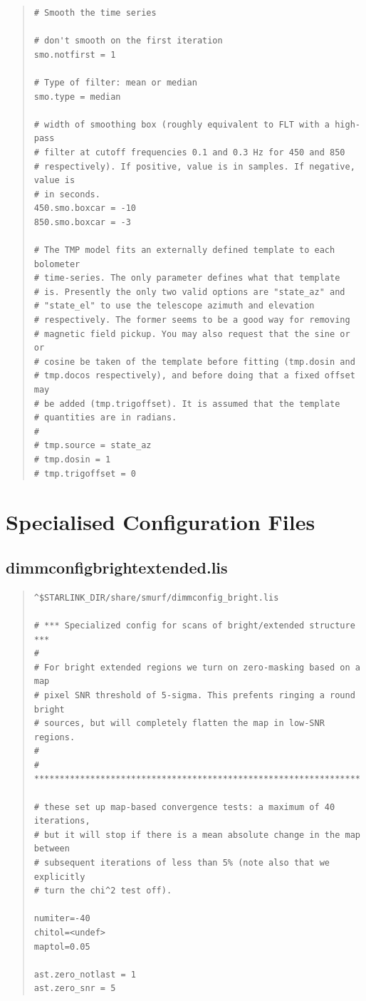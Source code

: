 \documentclass[twoside,11pt]{article}
\newcounter{box}
\newcommand{\xlabel}[1]{}
\renewcommand{\_}{\texttt{\symbol{95}}}
\newenvironment{myquote}{\begin{quote}\begin{small}}{\end{small}\end{quote}}
\begin{document}
\begin{myquote}
\begin{verbatim}
# Smooth the time series

# don't smooth on the first iteration
smo.notfirst = 1

# Type of filter: mean or median
smo.type = median

# width of smoothing box (roughly equivalent to FLT with a high-pass
# filter at cutoff frequencies 0.1 and 0.3 Hz for 450 and 850
# respectively). If positive, value is in samples. If negative, value is
# in seconds.
450.smo.boxcar = -10
850.smo.boxcar = -3

# The TMP model fits an externally defined template to each bolometer
# time-series. The only parameter defines what that template
# is. Presently the only two valid options are "state_az" and
# "state_el" to use the telescope azimuth and elevation
# respectively. The former seems to be a good way for removing
# magnetic field pickup. You may also request that the sine or or
# cosine be taken of the template before fitting (tmp.dosin and
# tmp.docos respectively), and before doing that a fixed offset may
# be added (tmp.trigoffset). It is assumed that the template
# quantities are in radians.
#
# tmp.source = state_az
# tmp.dosin = 1
# tmp.trigoffset = 0

\end{verbatim}
\end{myquote}


\section{\xlabel{special}Specialised Configuration Files}
\label{app:special}

\subsection{dimmconfig\_bright\_extended.lis}
\begin{myquote}
\begin{verbatim}
^$STARLINK_DIR/share/smurf/dimmconfig_bright.lis

# *** Specialized config for scans of bright/extended structure ***
#
# For bright extended regions we turn on zero-masking based on a map
# pixel SNR threshold of 5-sigma. This prefents ringing a round bright
# sources, but will completely flatten the map in low-SNR regions.
#
# ****************************************************************

# these set up map-based convergence tests: a maximum of 40 iterations,
# but it will stop if there is a mean absolute change in the map between
# subsequent iterations of less than 5% (note also that we explicitly
# turn the chi^2 test off).

numiter=-40
chitol=<undef>
maptol=0.05

ast.zero_notlast = 1
ast.zero_snr = 5
\end{verbatim}
\end{myquote}
\end{document}
